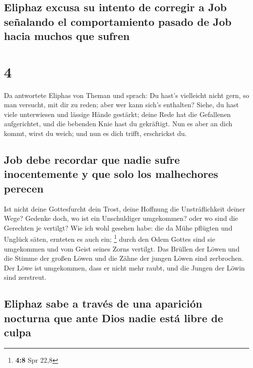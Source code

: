 \hypertarget{eliphaz-excusa-su-intento-de-corregir-a-job-seuxf1alando-el-comportamiento-pasado-de-job-hacia-muchos-que-sufren}{%
\subsection{Eliphaz excusa su intento de corregir a Job señalando el
comportamiento pasado de Job hacia muchos que
sufren}\label{eliphaz-excusa-su-intento-de-corregir-a-job-seuxf1alando-el-comportamiento-pasado-de-job-hacia-muchos-que-sufren}}

\hypertarget{section-3}{%
\section{4}\label{section-3}}

 Da antwortete Eliphas von Theman und sprach:
 Du hast's vielleicht nicht gern, so man versucht, mit dir
zu reden; aber wer kann sich's enthalten?  Siehe, du hast
viele unterwiesen und lässige Hände gestärkt;  deine Rede
hat die Gefallenen aufgerichtet, und die bebenden Knie hast du
gekräftigt.  Nun es aber an dich kommt, wirst du weich;
und nun es dich trifft, erschrickst du.

\hypertarget{job-debe-recordar-que-nadie-sufre-inocentemente-y-que-solo-los-malhechores-perecen}{%
\subsection{Job debe recordar que nadie sufre inocentemente y que solo
los malhechores
perecen}\label{job-debe-recordar-que-nadie-sufre-inocentemente-y-que-solo-los-malhechores-perecen}}

 Ist nicht deine Gottesfurcht dein Trost, deine Hoffnung
die Unsträflichkeit deiner Wege?  Gedenke doch, wo ist ein
Unschuldiger umgekommen? oder wo sind die Gerechten je vertilgt?
 Wie ich wohl gesehen habe: die da Mühe pflügten und
Unglück säten, ernteten es auch ein; \footnote{\textbf{4:8} Spr 22,8}
 durch den Odem Gottes sind sie umgekommen und vom Geist
seines Zorns vertilgt.  Das Brüllen der Löwen und die
Stimme der großen Löwen und die Zähne der jungen Löwen sind zerbrochen.
 Der Löwe ist umgekommen, dass er nicht mehr raubt, und
die Jungen der Löwin sind zerstreut.

\hypertarget{eliphaz-sabe-a-travuxe9s-de-una-apariciuxf3n-nocturna-que-ante-dios-nadie-estuxe1-libre-de-culpa}{%
\subsection{Eliphaz sabe a través de una aparición nocturna que ante
Dios nadie está libre de
culpa}\label{eliphaz-sabe-a-travuxe9s-de-una-apariciuxf3n-nocturna-que-ante-dios-nadie-estuxe1-libre-de-culpa}}

